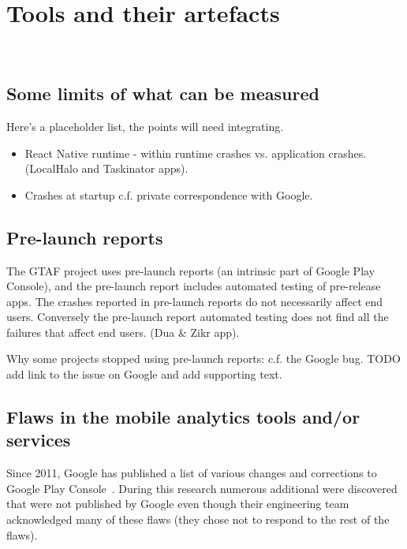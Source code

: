 \chapter{Tools and their artefacts}~\label{chapter-tools-and-their-artefacts}

\section{Some limits of what can be measured}

Here's a placeholder list, the points will need integrating.
\begin{itemize}
    \item React Native runtime - within runtime crashes vs. application crashes. (LocalHalo and Taskinator apps).
    \item Crashes at startup c.f. private correspondence with Google.
\end{itemize}

\section{Pre-launch reports}
The GTAF project uses pre-launch reports (an intrinsic part of Google Play Console), and the pre-launch report includes automated testing of pre-release apps. The crashes reported in pre-launch reports do not necessarily affect end users. Conversely the pre-launch report automated testing does not find all the failures that affect end users. (Dua \& Zikr app).

Why some projects stopped using pre-launch reports: c.f. the Google bug. TODO add link to the issue on Google and add supporting text.

\section{Flaws in the mobile analytics tools and/or services}

Since 2011, Google has published a list of various changes and corrections to Google Play Console~\citep{google_play_troubleshoot_app_statistics_problems}. During this research numerous additional were discovered that were not published by Google even though their engineering team acknowledged many of these flaws (they chose not to respond to the rest of the flaws). 

